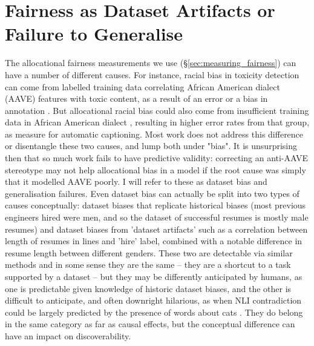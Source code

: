 
\section{Fairness as Dataset Artifacts or Failure to Generalise}
\label{sec:fairness_as_other_fields}
The allocational fairness measurements we use (\S \ref{sec:measuring_fairness}) can have a number of different causes. For instance, racial bias in toxicity detection can come from labelled training data correlating African American dialect (AAVE) features with toxic content, as a result of an error or a bias in annotation \citep{sap-etal-2019-risk}. But allocational racial bias could also come from insufficient training data in African American dialect , resulting in higher error rates from that group, as \citet{tatman17_interspeech} measure for automatic captioning. Most work does not address this difference or disentangle these two causes, and lump both under "bias". It is unsurprising then that so much work fails to have predictive validity: correcting an anti-AAVE stereotype may not help allocational bias in a model if the root cause was simply that it modelled AAVE poorly. I will refer to these as dataset bias and generalisation failures. Even dataset bias can actually be split into two types of causes conceptually: dataset biases that replicate historical biases (most previous engineers hired were men, and so the dataset of successful resumes is mostly male resumes) and dataset biases from 'dataset artifacts' such as a correlation between length of resumes in lines and 'hire' label, combined with a notable difference in resume length between different genders. These two are detectable via similar methods and in some sense they are the same -- they are a shortcut to a task supported by a dataset -- but they may be differently anticipated by humans, as one is predictable given knowledge of historic dataset biases, and the other is difficult to anticipate, and often downright hilarious, as when NLI contradiction could be largely predicted by the presence of words about cats \citep{gururangan-etal-2018-annotation}. They do belong in the same category as far as causal effects, but the conceptual difference can have an impact on discoverability.

